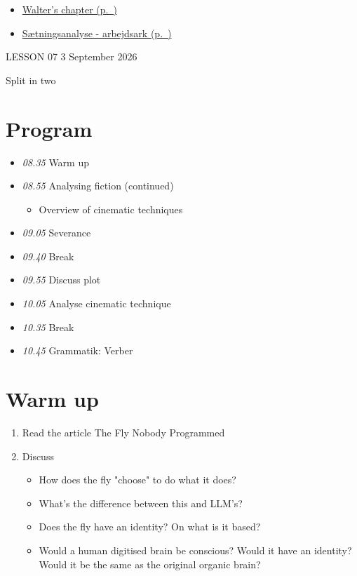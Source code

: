 \documentclass[11pt,a4paper,oneside]{book}
\begin{document}
\begin{itemize}
\item \hyperref[worksheet-8]{Walter's chapter (p.~\pageref*{worksheet-8})}
\item \hyperref[worksheet-9]{Sætningsanalyse - arbejdsark (p.~\pageref*{worksheet-9})}
\end{itemize}

\clearpage{}
{\color{blue}\small LESSON 07 \hfill 3 September 2026\par}
\vspace{4mm}
{\displayfont\color{navy}\fontsize{30}{34}\selectfont Split in two\par}\vspace{4mm}

\section*{Program}

\begin{itemize}
\item \emph{08.35} Warm up
\item \emph{08.55} Analysing fiction (continued)

\begin{itemize}
\item Overview of cinematic techniques
\end{itemize}

\item \emph{09.05} Severance
\item \emph{09.40} Break
\item \emph{09.55} Discuss plot
\item \emph{10.05} Analyse cinematic technique
\item \emph{10.35} Break
\item \emph{10.45} Grammatik: Verber
\end{itemize}

\section*{Warm up}

\begin{enumerate}
\item Read the article The Fly Nobody Programmed
\item Discuss

\begin{itemize}
\item How does the fly "choose" to do what it does?
\item What's the difference between this and LLM's?
\item Does the fly have an identity? On what is it based?
\item Would a human digitised brain be conscious? Would it have an identity? Would it be the same as the original organic brain?
\end{itemize}

\end{enumerate}
\end{document}
